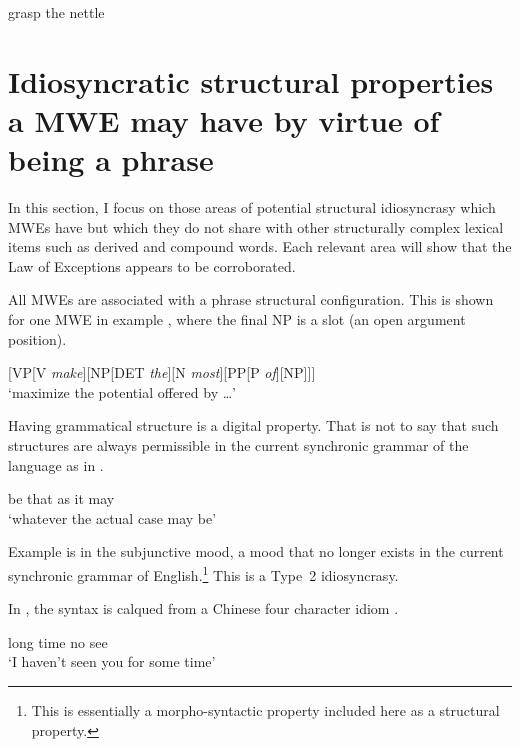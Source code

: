 \documentclass[output=paper]{langsci/langscibook}
\begin{document}
\begin{exe}
\ex\label{ex:ex24}    grasp the nettle
\end{exe}



\section{Idiosyncratic structural properties a MWE may have by virtue of being a phrase}

In this section, %
I focus on those areas of potential structural idiosyncrasy which MWEs have but which they do not 
share with other structurally complex lexical items such as derived and compound words. Each 
relevant area will show that the Law of Exceptions appears to be corroborated. 


All MWEs are associated with a phrase structural configuration. This is shown for one MWE in example , where the final NP is a slot (an open argument position).

\begin{exe}
\ex\label{ex:ex25}   [VP[V \textit{make}][NP[DET \textit{the}][N \textit{most}][PP[P \textit{of}][NP]]] \\
‘maximize the potential offered by \ldots’ 
\end{exe}


Having grammatical structure is a digital property. That is not 
to say that such structures are always permissible in the 
current synchronic grammar of the language as in
.

\begin{exe}
\ex\label{ex:ex26} be that as it may\\
‘whatever the actual case may be’
\end{exe}


Example  is in the subjunctive mood, a mood that no longer exists in the current synchronic grammar of  English.\footnote{ This is essentially a morpho-syntactic property included here as a structural property.} This is a Type~2 idiosyncrasy.

In , the syntax is calqued from a Chinese four character idiom \citep{rohtua}.

\begin{exe}
\ex\label{ex:ex27} long time no see\\
‘I haven’t seen you for some time’ 
\end{exe}
\end{document}
